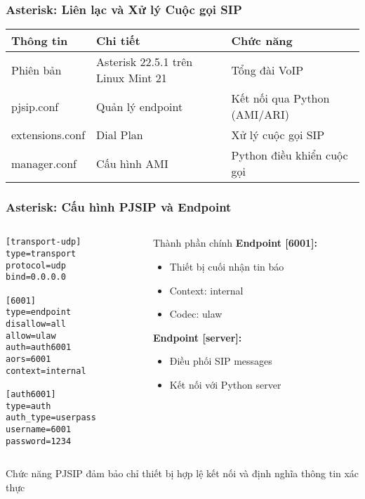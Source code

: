 \begin{frame}
\frametitle{Asterisk: Liên lạc và Xử lý Cuộc gọi SIP}
\scriptsize
\begin{tabular}{|p{2.3cm}|p{4cm}|p{3cm}|}
\hline
\textbf{Thông tin} & \textbf{Chi tiết} & \textbf{Chức năng} \\
\hline
Phiên bản & Asterisk 22.5.1 trên Linux Mint 21 & Tổng đài VoIP \\
\hline
pjsip.conf & Quản lý endpoint & Kết nối qua Python (AMI/ARI) \\
\hline
extensions.conf & Dial Plan & Xử lý cuộc gọi SIP \\
\hline
manager.conf & Cấu hình AMI & Python điều khiển cuộc gọi \\
\hline
\end{tabular}

\end{frame}


\begin{frame}[fragile]
\frametitle{Asterisk: Cấu hình PJSIP và Endpoint}

\begin{columns}[t]
\begin{column}{0.55\textwidth}
\begin{verbatim}
[transport-udp]
type=transport
protocol=udp
bind=0.0.0.0

[6001]
type=endpoint
disallow=all
allow=ulaw
auth=auth6001
aors=6001
context=internal

[auth6001]
type=auth
auth_type=userpass
username=6001
password=1234
\end{verbatim}
\end{column}

\begin{column}{0.4\textwidth}
\begin{block}{Thành phần chính}
\textbf{Endpoint [6001]:}
\begin{itemize}
\item Thiết bị cuối nhận tin báo
\item Context: internal
\item Codec: ulaw
\end{itemize}

\textbf{Endpoint [server]:}
\begin{itemize}
\item Điều phối SIP messages
\item Kết nối với Python server
\end{itemize}
\end{block}
\end{column}
\end{columns}

\vspace{0.2cm}
\begin{alertblock}{Chức năng}
PJSIP đảm bảo chỉ thiết bị hợp lệ kết nối và định nghĩa thông tin xác thực
\end{alertblock}

\end{frame}

